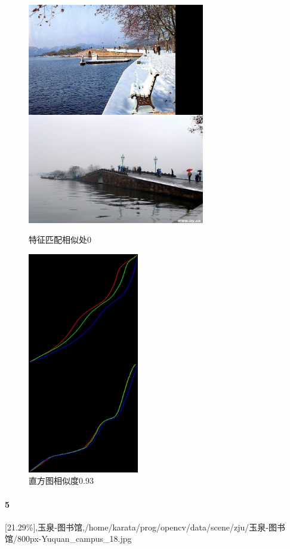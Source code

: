 \begin{figure}[htb]
\begin{minipage}[t]{0.5\linewidth}
\centering
\includegraphics[height=3.8in]{断桥.jpg.d/im4sift.jpg}
\caption{特征匹配相似处0}
\label{fig:side:a}
\end{minipage}%
\begin{minipage}[t]{0.5\linewidth}
\centering
\includegraphics[height=3.8in]{断桥.jpg.d/im4hist2.jpg}
\caption{直方图相似度0.93}
\label{fig:side:a}
\end{minipage}%
\end{figure}

\paragraph{5}
[21.29\%],玉泉-图书馆,/home/karata/prog/opencv/data/scene/zju/玉泉-图书馆/800px-Yuquan_campus_18.jpg

